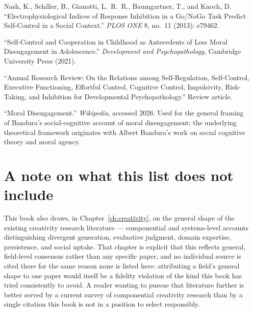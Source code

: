 Nash, K., Schiller, B., Gianotti, L.~R.~R., Baumgartner, T., and Knoch, D. ``Electrophysiological Indices of Response Inhibition in a Go/NoGo Task Predict Self-Control in a Social Context.'' \emph{PLOS ONE} 8, no.~11 (2013): e79462.

``Self-Control and Cooperation in Childhood as Antecedents of Less Moral Disengagement in Adolescence.'' \emph{Development and Psychopathology}, Cambridge University Press (2021).

``Annual Research Review: On the Relations among Self-Regulation, Self-Control, Executive Functioning, Effortful Control, Cognitive Control, Impulsivity, Risk-Taking, and Inhibition for Developmental Psychopathology.'' Review article.

``Moral Disengagement.'' \emph{Wikipedia}, accessed 2026. Used for the general framing of Bandura's social-cognitive account of moral disengagement; the underlying theoretical framework originates with Albert Bandura's work on social cognitive theory and moral agency.

\section*{A note on what this list does not include}

This book also draws, in Chapter~\ref{ch:creativity}, on the general shape of the existing creativity research literature --- componential and systems-level accounts distinguishing divergent generation, evaluative judgment, domain expertise, persistence, and social uptake. That chapter is explicit that this reflects general, field-level consensus rather than any specific paper, and no individual source is cited there for the same reason none is listed here: attributing a field's general shape to one paper would itself be a fidelity violation of the kind this book has tried consistently to avoid. A reader wanting to pursue that literature further is better served by a current survey of componential creativity research than by a single citation this book is not in a position to select responsibly.
